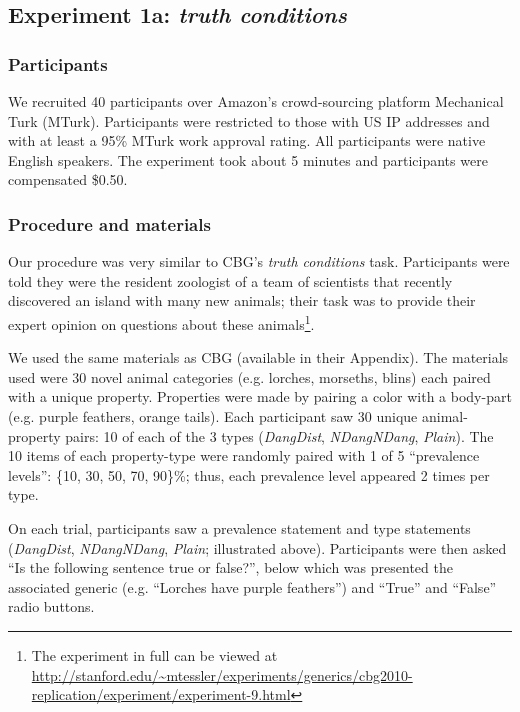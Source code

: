 \documentclass[10pt,letterpaper]{article}
\begin{document}
\subsection{Experiment 1a: \emph{truth conditions}}

\subsubsection{Participants}

We recruited 40 participants over Amazon's crowd-sourcing platform Mechanical Turk (MTurk).  Participants were restricted to those with US IP addresses and with at least a 95\% MTurk work approval rating. All participants were native English speakers. The experiment took about 5 minutes and participants were compensated \$0.50.

\subsubsection{Procedure and materials}

Our procedure was very similar to CBG's \emph{truth conditions} task. Participants were told they were the resident zoologist of a team of scientists that recently discovered an island with many new animals; their task was to provide their expert opinion on questions about these animals\footnote{The experiment in full can be viewed at \url{http://stanford.edu/~mtessler/experiments/generics/cbg2010-replication/experiment/experiment-9.html}}. 

 
We used the same materials as CBG (available in their Appendix). The materials used were 30 novel animal categories (e.g. lorches, morseths, blins) each paired with a unique property. Properties were made by pairing a color with a body-part (e.g. purple feathers, orange tails). Each participant saw 30 unique animal-property pairs: 10 of each of the 3 types (\emph{DangDist}, \emph{NDangNDang}, \emph{Plain}). The 10 items of each property-type were randomly paired with 1 of 5 ``prevalence levels'': \{10, 30, 50, 70, 90\}\%; thus, each prevalence level appeared 2 times per type. 

On each trial, participants saw a prevalence statement and type statements (\emph{DangDist}, \emph{NDangNDang}, \emph{Plain}; illustrated above). 
Participants were then asked ``Is the following sentence true or false?'', below which was presented the associated generic (e.g. ``Lorches have purple feathers'') and ``True'' and ``False'' radio buttons. 
\end{document}
